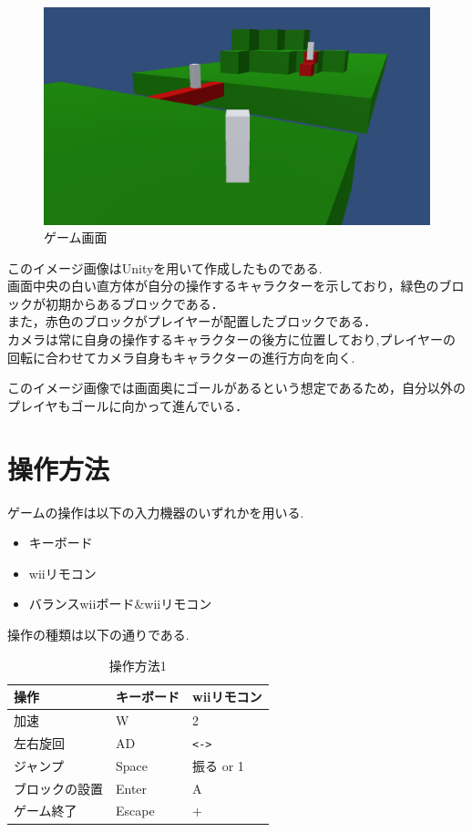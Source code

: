 \documentclass{jarticle}
\begin{document}
\begin{figure}[H]
    \centering
    \label{ゲーム画面}
    \includegraphics[scale=0.3]{game.png}
    \caption{ゲーム画面}
\end{figure}

このイメージ画像はUnityを用いて作成したものである.  \\
画面中央の白い直方体が自分の操作するキャラクターを示しており，緑色のブロックが初期からあるブロックである．\\
また，赤色のブロックがプレイヤーが配置したブロックである．\\

カメラは常に自身の操作するキャラクターの後方に位置しており,プレイヤーの回転に合わせてカメラ自身もキャラクターの進行方向を向く.

このイメージ画像では画面奥にゴールがあるという想定であるため，自分以外のプレイヤもゴールに向かって進んでいる．

\section{操作方法}
ゲームの操作は以下の入力機器のいずれかを用いる.
\begin{itemize}
    \item キーボード
    \item wiiリモコン
    \item バランスwiiボード\&wiiリモコン
\end{itemize}

操作の種類は以下の通りである.
\begin{table}[H]
    \caption{操作方法1}
    \label{table:control1}
    \begin{center}
    \begin{tabular}{|l|l|l|}\hline
    操作 & キーボード & wiiリモコン\\ \hline
    加速 & W & 2 \\ \hline
    左右旋回 & AD & \verb+<->+ \\ \hline
    ジャンプ & Space & 振る or 1 \\ \hline
    ブロックの設置 & Enter & A \\ \hline
    ゲーム終了 & Escape& + \\\hline

    \end{tabular}
    \end{center}
\end{table}
\end{document}
